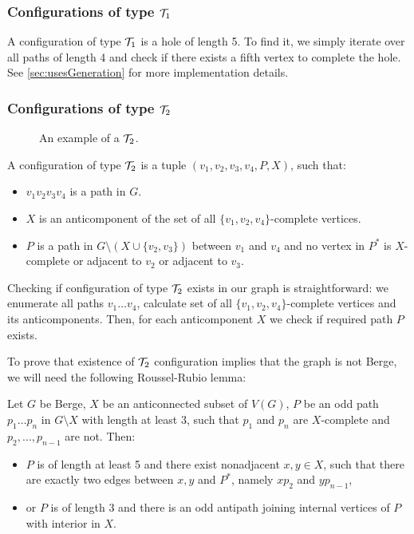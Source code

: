 \subsubsection{Configurations of type $\mathcal{T}_1$}

A configuration of type $\mathcal{T}_1$ is a hole of length 5. To find it, we simply iterate over all paths of length 4 and check if there exists a fifth vertex to complete the hole. See \cref{sec:usesGeneration} for more implementation details.

\subsubsection{Configurations of type $\mathcal{T}_2$}

\begin{wrapfigure}{r}{0.35\textwidth}
	
	\caption{An example of a $\mathcal{T}_2$.}%
	\vspace{-1.5cm}
\end{wrapfigure}

A configuration of type $\mathcal{T}_2$ is a tuple $(v_1, v_2, v_3, v_4, P, X)$, such that:
\begin{itemize}
	\item $v_1v_2v_3v_4$ is a path in $G$.
	\item $X$ is an anticomponent of the set of all $\{v_1, v_2, v_4\}$-complete vertices.
	\item $P$ is a path in $G\setminus(X \cup \{v_2, v_3\})$ between $v_1$ and $v_4$ and no vertex in $P^*$ is $X$-complete or adjacent to $v_2$ or adjacent to $v_3$.
\end{itemize}

Checking if configuration of type $\mathcal{T}_2$ exists in our graph is straightforward: we enumerate all paths $v_1\ldots v_4$, calculate set of all $\{v_1, v_2, v_4\}$-complete vertices and its anticomponents. Then, for each anticomponent $X$ we check if required path $P$ exists.

To prove that existence of $\mathcal{T}_2$ configuration implies that the graph is not Berge, we will need the following Roussel-Rubio lemma:

\begin{lemma}\label{lem:Roussel-Rubio}
	Let $G$ be Berge, $X$ be an anticonnected subset of $V(G)$, $P$ be an odd path $p_1\ldots p_n$ in $G\setminus X$ with length at least 3, such that $p_1$ and $p_n$ are $X$-complete and $p_2, \ldots, p_{n-1}$ are not. Then:
	\begin{itemize}
		\item $P$ is of length at least 5 and there exist nonadjacent $x, y \in X$, such that there are exactly two edges between $x, y$ and $P^*$, namely $xp_2$ and $yp_{n-1}$,
		\item or $P$ is of length 3 and there is an odd antipath joining internal vertices of $P$ with interior in $X$.
	\end{itemize}
\end{lemma}

